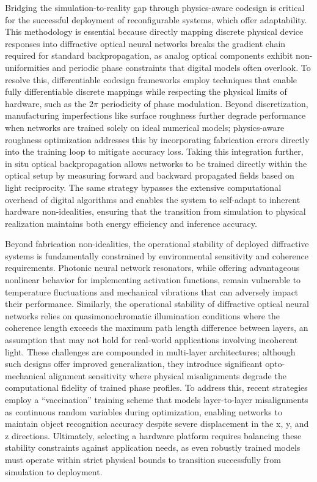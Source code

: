 Bridging the simulation-to-reality gap through physics-aware codesign is critical for the successful deployment of reconfigurable systems, which offer adaptability. This methodology is essential because directly mapping discrete physical device responses into diffractive optical neural networks breaks the gradient chain required for standard backpropagation, as analog optical components exhibit non-uniformities and periodic phase constraints that digital models often overlook. To resolve this, differentiable codesign frameworks employ techniques that enable fully differentiable discrete mappings while respecting the physical limits of hardware, such as the \(2\pi\) periodicity of phase modulation. Beyond discretization, manufacturing imperfections like surface roughness further degrade performance when networks are trained solely on ideal numerical models; physics-aware roughness optimization addresses this by incorporating fabrication errors directly into the training loop to mitigate accuracy loss. Taking this integration further, in situ optical backpropagation allows networks to be trained directly within the optical setup by measuring forward and backward propagated fields based on light reciprocity. The same strategy bypasses the extensive computational overhead of digital algorithms and enables the system to self-adapt to inherent hardware non-idealities, ensuring that the transition from simulation to physical realization maintains both energy efficiency and inference accuracy. \citep{doi_10_1145_3508352_3549378_13c53996} \citep{doi_10_1109_dac56929_2023_10247715_f78d6713} \citep{doi_10_1364_prj_389553_d7a30418}

Beyond fabrication non-idealities, the operational stability of deployed diffractive systems is fundamentally constrained by environmental sensitivity and coherence requirements. Photonic neural network resonators, while offering advantageous nonlinear behavior for implementing activation functions, remain vulnerable to temperature fluctuations and mechanical vibrations that can adversely impact their performance. Similarly, the operational stability of diffractive optical neural networks relies on quasimonochromatic illumination conditions where the coherence length exceeds the maximum path length difference between layers, an assumption that may not hold for real-world applications involving incoherent light. These challenges are compounded in multi-layer architectures; although such designs offer improved generalization, they introduce significant opto-mechanical alignment sensitivity where physical misalignments degrade the computational fidelity of trained phase profiles. To address this, recent strategies employ a ``vaccination'' training scheme that models layer-to-layer misalignments as continuous random variables during optimization, enabling networks to maintain object recognition accuracy despite severe displacement in the x, y, and z directions. Ultimately, selecting a hardware platform requires balancing these stability constraints against application needs, as even robustly trained models must operate within strict physical bounds to transition successfully from simulation to deployment. \citep{doi_10_3390_nano14080697_c372a140} \citep{doi_10_1364_oe_523619_ddeb1b53} \citep{doi_10_1515_nanoph_2020_0291_c4a9f42d}

